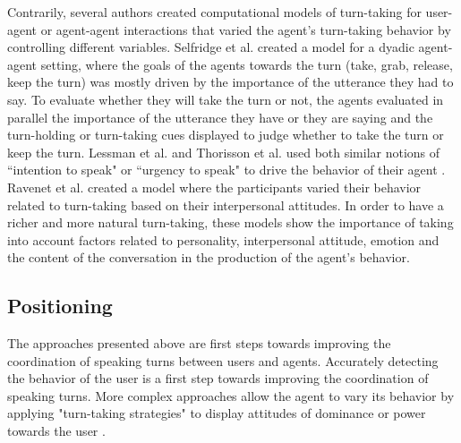 Contrarily, several authors created computational models of
turn-taking for user-agent or agent-agent interactions
that varied the agent's turn-taking behavior by controlling 
different variables. 
Selfridge et al. \citep{selfridge_bidding_2009} created a model for a dyadic
agent-agent setting, where the goals of the agents towards the turn (take, grab, release, keep the turn) was mostly driven by the importance
of the utterance they had to say. To evaluate whether they
will take the turn or not, the agents evaluated in parallel
the importance of the utterance they have or they are saying
and the turn-holding or turn-taking cues displayed to
judge whether to take the turn or keep the turn. Lessman et al. \citep{lessmann_towards_2004}and Thorisson et al. \citep{thorisson_multiparty_2010}
used both similar notions of ``intention to speak" \citep{lessmann_towards_2004} or
``urgency to speak" to drive the behavior of their agent
\citep{thorisson_multiparty_2010}. Ravenet et al. \citep{ravenet_conversational_2015} created a model where the participants varied
their behavior related to turn-taking based on their interpersonal
attitudes. In order to have a richer and more
natural turn-taking, these models show the importance
of taking into account factors related to personality,
interpersonal attitude, emotion and the content of the
conversation in the production of the agent's behavior. 

\subsection{Positioning}

The approaches presented above are first steps towards improving the coordination of speaking turns between users and agents. Accurately detecting the behavior of the user is a first step towards improving the coordination of speaking turns. More complex approaches allow the agent to vary its behavior by applying "turn-taking strategies" \citep{ter_maat_how_2010} to display attitudes of dominance or power towards the user \citep{ravenet_conversational_2015,cafaro_effects_2016}. %

